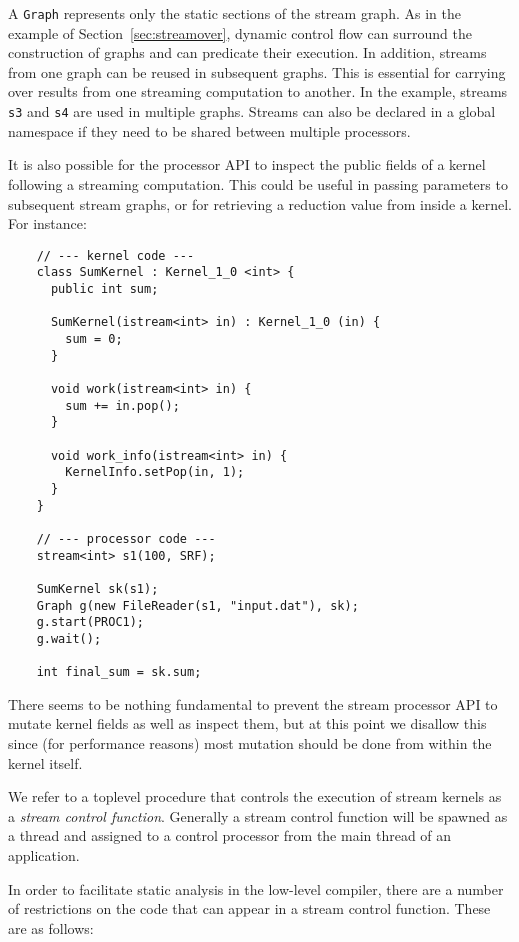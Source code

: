 
A {\tt Graph} represents only the static sections of the stream graph.
As in the example of Section~\ref{sec:streamover}, dynamic control
flow can surround the construction of graphs and can predicate their
execution.  In addition, streams from one graph can be reused in
subsequent graphs.  This is essential for carrying over results from
one streaming computation to another.  In the example, streams {\tt
s3} and {\tt s4} are used in multiple graphs.  Streams can also be
declared in a global namespace if they need to be shared between
multiple processors.

It is also possible for the processor API to inspect the public
fields of a kernel following a streaming computation.  This could be
useful in passing parameters to subsequent stream graphs, or for
retrieving a reduction value from inside a kernel.  For instance:
{\small
\begin{verbatim}
    // --- kernel code ---
    class SumKernel : Kernel_1_0 <int> {
      public int sum;

      SumKernel(istream<int> in) : Kernel_1_0 (in) {
        sum = 0;
      }

      void work(istream<int> in) {
        sum += in.pop();
      }

      void work_info(istream<int> in) {
        KernelInfo.setPop(in, 1);
      }
    }

    // --- processor code ---
    stream<int> s1(100, SRF);

    SumKernel sk(s1);
    Graph g(new FileReader(s1, "input.dat"), sk);
    g.start(PROC1);
    g.wait();

    int final_sum = sk.sum;
\end{verbatim}}

There seems to be nothing fundamental to prevent the stream processor
API to mutate kernel fields as well as inspect them, but at this point
we disallow this since (for performance reasons) most mutation should
be done from within the kernel itself.


We refer to a toplevel procedure that controls the execution of stream
kernels as a {\it stream control function}.  Generally a stream
control function will be spawned as a thread and assigned to a control
processor from the main thread of an application.

In order to facilitate static analysis in the low-level compiler,
there are a number of restrictions on the code that can appear in a
stream control function.  These are as follows:

